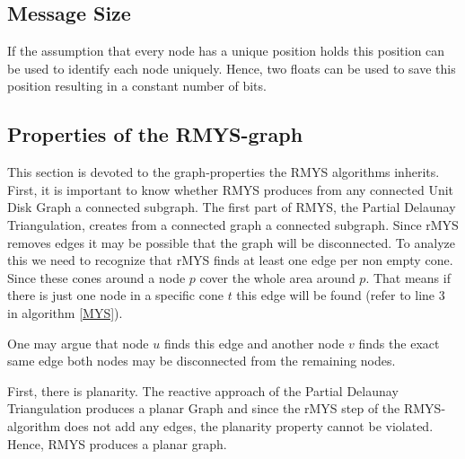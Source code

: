 \subsection{Message Size}
If the assumption that every node has a unique position holds this position can be used to identify each node uniquely.
Hence, two floats can be used to save this position resulting in a constant number of bits.

\subsection{Properties of the RMYS-graph}
This section is devoted to the graph-properties the RMYS algorithms inherits.
First, it is important to know whether RMYS produces from any connected Unit Disk Graph a connected subgraph.
The first part of RMYS, the Partial Delaunay Triangulation, creates from a connected graph a connected subgraph.
Since rMYS removes edges it may be possible that the graph will be disconnected.
To analyze this we need to recognize that rMYS finds at least one edge per non empty cone.
Since these cones around a node $p $ cover the whole area around $p $.
That means if there is just one node in a specific cone $t $ this edge will be found (refer to line 3 in algorithm \ref{MYS}).


One may argue that node $u $ finds this edge and another node $v $ finds the exact same edge both nodes may be disconnected from the remaining nodes.


First, there is planarity.
The reactive approach of the Partial Delaunay Triangulation produces a planar Graph and since the rMYS step of the RMYS-algorithm does not add any edges, the planarity property cannot be violated.
Hence, RMYS produces a planar graph.


